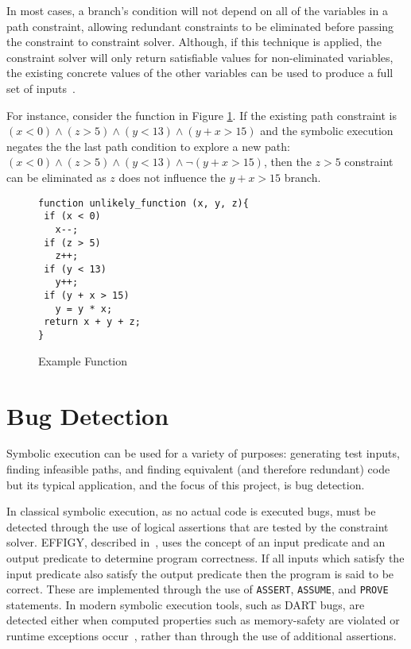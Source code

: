\documentclass[]{final_report}
\begin{document}
In most cases, a branch's condition will not depend on all of the variables in a path constraint, allowing redundant constraints to be eliminated before passing the constraint to constraint solver. Although, if this technique is applied, the constraint solver will only return satisfiable values for non-eliminated variables, the existing concrete values of the other variables can be used to produce a full set of inputs~\cite{cadar2013symbolic}.

For instance, consider the function in Figure \ref{fig:example-function}. If the existing path constraint is $(x < 0 ) \land ( z > 5) \land (y < 13) \land (y + x > 15)$ and the symbolic execution negates the the last path condition to explore a new path: $ (x < 0) \land (z > 5) \land (y < 13) \land \lnot(y + x > 15)$, then the $z > 5$ constraint can be eliminated as $z$ does not influence the $y + x > 15$ branch.

\begin{figure}[t]
\begin{verbatim}
function unlikely_function (x, y, z){
 if (x < 0)
   x--;
 if (z > 5)
   z++;
 if (y < 13)
   y++;
 if (y + x > 15)
   y = y * x;
 return x + y + z;
}
\end{verbatim}
\caption{\label{fig:example-function} Example Function}
\end{figure} 

\section{Bug Detection}

Symbolic execution can be used for a variety of purposes: generating test inputs, finding infeasible paths, and finding equivalent (and therefore redundant) code but its typical application, and the focus of this project, is bug detection.

In classical symbolic execution, as no actual code is executed bugs, must be detected through the use of logical assertions that are tested by the constraint solver. EFFIGY, described in~\cite{king1976symbolic}, uses the concept of an input predicate and an output predicate to determine program correctness. If all inputs which satisfy the input predicate also satisfy the output predicate then the program is said to be correct. These are implemented through the use of \lstinline|ASSERT|, \lstinline|ASSUME|, and \lstinline|PROVE| statements. In modern symbolic execution tools, such as DART bugs, are detected either when computed properties such as memory-safety are violated or runtime exceptions occur~\cite{godefroid2005dart}, rather than through the use of additional assertions.
\end{document}
